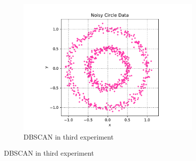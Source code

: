 \begin{figure}[h]
\begin{subfigure}{0.33\textwidth}
		\includegraphics[width=\linewidth]{figures/3-NoisyCircle}
		\caption{DBSCAN in third experiment}
		\label{fig:p1-3}
	\end{subfigure}	
	

\end{figure}
